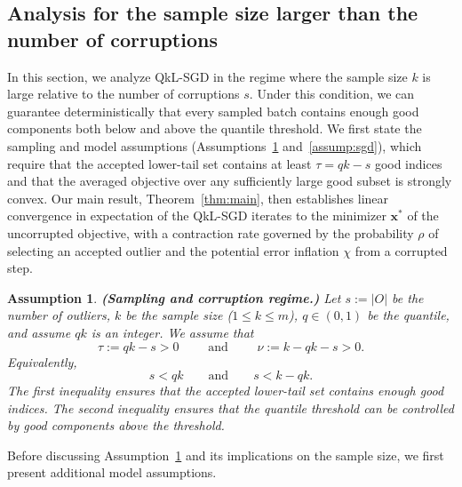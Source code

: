 \documentclass[11pt]{article}
\newcommand{\ve}[1]{\mathbf{#1}}
\newtheorem{assump}{Assumption}
\begin{document}
\subsection{Analysis for the sample size larger than the number of corruptions}\label{sec:large-sample}

{In this section, we analyze QkL-SGD in the regime where the sample size $k$ is large relative to the number of corruptions $s$. Under this condition, we can guarantee deterministically that every sampled batch contains enough good components both below and above the quantile threshold. We first state the sampling and model assumptions (Assumptions~\ref{assump:samplesize} and~\ref{assump:sgd}), which require that the accepted lower-tail set contains at least $\tau = qk - s$ good indices and that the averaged objective over any sufficiently large good subset is strongly convex. Our main result, Theorem~\ref{thm:main}, then establishes linear convergence in expectation of the QkL-SGD iterates to the minimizer $\ve{x}^*$ of the uncorrupted objective, with a contraction rate governed by the probability $\rho$ of selecting an accepted outlier and the potential error inflation $\chi$ from a corrupted step. }


\begin{assump}
{\textbf{(Sampling and corruption regime.)}}
    Let
$s:=|O|$
be the number of outliers, $k$ be the sample size ($1\le k\le m$), $q \in (0,1)$ be the quantile, and assume $qk$ is an integer. We assume that
\begin{equation}\label{eq:tau-nu}
{\tau:= qk -s > 0}
\qquad \text{ and } \qquad
{\nu:=k- qk-s> 0.}
\end{equation}
    Equivalently,
    \[
   { s< qk}
    \qquad
    \text{and}
    \qquad
    {s<k- qk}.
    \]
    The first inequality ensures that the accepted lower-tail set contains enough good indices. The second inequality ensures that the quantile threshold can be controlled by good components above the threshold.


\label{assump:samplesize}
\end{assump}

Before discussing Assumption~\ref{assump:samplesize} and its implications on the sample size, we first present additional model assumptions.
\end{document}
